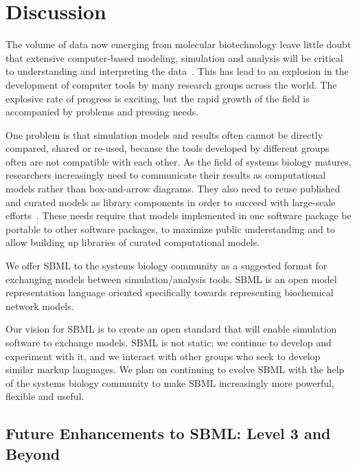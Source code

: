 \documentclass[10pt]{cekarticle}
\begin{document}
\section{Discussion}
\label{sec:discussion}

The volume of data now emerging from molecular biotechnology
leave little doubt that extensive computer-based modeling, simulation and
analysis will be critical to understanding and interpreting the
data~\citep{abbott:1999,gilman:2000,popel:1998,smaglik:2000}.  This
has lead to an explosion in the development of computer tools by many
research groups across the world.  The explosive rate of progress is
exciting, but the rapid growth of the field is accompanied by problems and
pressing needs.

One problem is that simulation models and results often cannot be directly
compared, shared or re-used, because the tools developed by different
groups often are not compatible with each other.  As the field of systems
biology matures, researchers increasingly need to communicate their results
as computational models rather than box-and-arrow diagrams.  They also need
to reuse published and curated models as library components in order to
succeed with large-scale efforts~\cite[e.g., the Alliance for Cellular
Signaling;][]{gilman:2000,smaglik:2000}.  These needs require that models
implemented in one software package be portable to other software packages,
to maximize public understanding and to allow building up libraries of
curated computational models.

We offer SBML to the systems biology community as a suggested
format for exchanging models between simulation/analysis tools.
SBML is an open model representation language oriented
specifically towards representing biochemical network models.

Our vision for SBML is to create an open standard that will enable
simulation software to exchange models.  SBML is not static; we continue to
develop and experiment with it, and we interact with other groups who seek
to develop similar markup languages.  We plan on continuing to evolve SBML
with the help of the systems biology community to make SBML increasingly
more powerful, flexible and useful.


\subsection{Future Enhancements to SBML: Level 3 and Beyond}
\label{sec:level-3}
\end{document}
